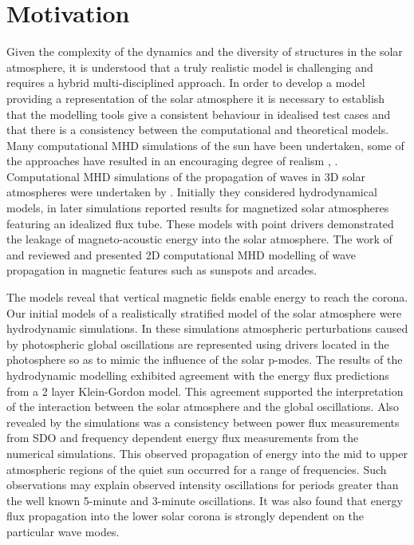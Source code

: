\documentclass[linenumbers]{aastex63}
\begin{document}
\section{Motivation} \label{sec:motivation}

Given the complexity of the dynamics and the diversity of structures in the solar atmosphere, it is understood that a truly realistic model is challenging and requires a hybrid multi-disciplined approach. In order to develop a model providing a representation of the solar atmosphere it is necessary to establish that the modelling tools give a consistent behaviour in idealised test cases and that there is a consistency between the computational and theoretical models. Many computational MHD simulations of the sun have been undertaken, some of the approaches have resulted in an encouraging degree of realism  \citet{Vogler2005}, \citet{Gudiksen2011}. Computational MHD simulations of the propagation of waves in 3D solar atmospheres were undertaken by \citet{Fedun2009a}. Initially they considered hydrodynamical models, in later simulations \citet{Fedun2009b} \citet{Vigeesh2012} reported results for magnetized solar atmospheres featuring an idealized flux tube. These models with point drivers demonstrated the leakage of magneto-acoustic energy into the solar atmosphere. The work of \citet{Khomenko2013} and  \citet{Santamaria2015} reviewed and presented 2D computational MHD modelling of wave propagation in magnetic features such as sunspots and arcades. 

 
The models reveal that vertical magnetic fields enable energy to reach the corona. Our initial models of a realistically stratified model of the solar atmosphere \citet{Griffiths2018b} were hydrodynamic simulations. In these simulations atmospheric perturbations caused by photospheric global oscillations are represented using drivers located in the photosphere so as to mimic the influence of the solar p-modes. The results of the hydrodynamic modelling exhibited agreement  with the energy flux predictions from a 2 layer Klein-Gordon model. This agreement supported the interpretation of the interaction between the solar atmosphere and the global oscillations. Also revealed by the simulations  was a consistency between power flux measurements from SDO and frequency dependent energy flux measurements from the numerical simulations. This observed propagation of energy into the mid to upper atmospheric regions of the quiet sun occurred for a range of frequencies. Such observations may explain observed intensity oscillations for periods greater than the well known 5-minute and 3-minute oscillations. It was also found that energy flux propagation into the lower solar corona is strongly dependent on the particular wave modes. 
\end{document}
